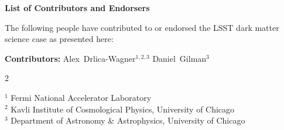 
\begin{center}
  {\Large \bf List of Contributors and Endorsers}
\end{center}
\bigskip

The following people have contributed to or endorsed the LSST dark matter science case as presented here:

\def\altaffilmark#1{\textsuperscript{#1}}
\def\affil#1{\noindent #1 \\}

\normalsize
\begin{raggedright}
\textbf{Contributors:}
Alex~Drlica-Wagner$^{1,2,3}$
Daniel~Gilman$^{3}$

\clearpage
\begin{multicols}{2}
\scriptsize
\parskip=4pt

\affil{$^{1}$ Fermi National Accelerator Laboratory}
\affil{$^{2}$ Kavli Institute of Cosmological Physics, University of Chicago}
\affil{$^{3}$ Department of Astronomy \& Astrophysics, University of Chicago}


\normalsize
\end{multicols}
\parskip=8pt

\end{raggedright}

